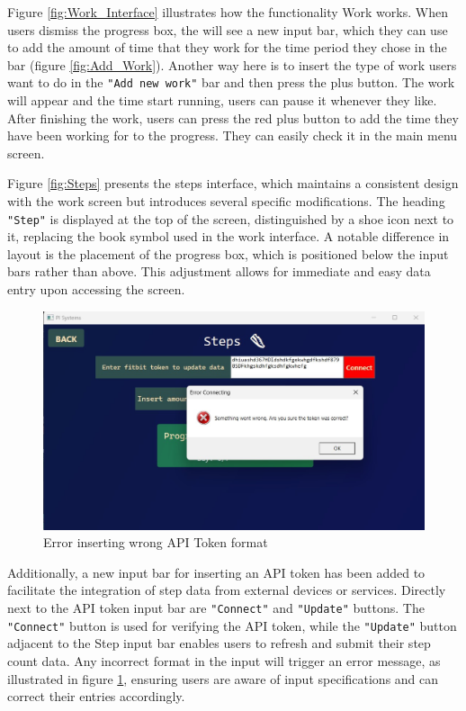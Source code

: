 \documentclass[12pt]{article}
\begin{document}
Figure \ref{fig:Work_Interface} illustrates how the functionality Work works. When users dismiss
the progress box, the will see a new input bar, which they can use to add the amount of time that
they work for the time period they chose in the bar (figure \ref{fig:Add_Work}). Another way here
is to insert the type of work users want to do in the \texttt{"Add new work"} bar and then press 
the plus button. The work will appear and the time start running, users can pause it whenever they
like. After finishing the work, users can press the red plus button to add the time they have been
working for to the progress. They can easily check it in the main menu screen.\par

Figure \ref{fig:Steps} presents the steps interface, which maintains a consistent design
with the work screen but introduces several specific modifications. The heading \texttt{"Step"} is
displayed at the top of the screen, distinguished by a shoe icon next to it, replacing the
book symbol used in the work interface. A notable difference in layout is the placement of
the progress box, which is positioned below the input bars rather than above. This adjustment
allows for immediate and easy data entry upon accessing the screen.\par

\begin{figure}[!ht]
  \centering
  \includegraphics[width = 0.5\linewidth]{Error}
  \caption{Error inserting wrong API Token format}
  \label{fig:Error}
\end{figure}

Additionally, a new input bar for inserting an API token has been added to facilitate the integration of step data from
external devices or services. Directly next to the API token input bar are \texttt{"Connect"} and 
\texttt{"Update"} buttons. The \texttt{"Connect"} button is used for verifying the API token, while the \texttt{"Update"}
button adjacent to the Step input bar enables users to refresh and submit their step count 
data. Any incorrect format in the input will trigger an error message, as illustrated in 
figure \ref{fig:Error}, ensuring users are aware of input specifications and can correct their entries accordingly.\par
\end{document}

